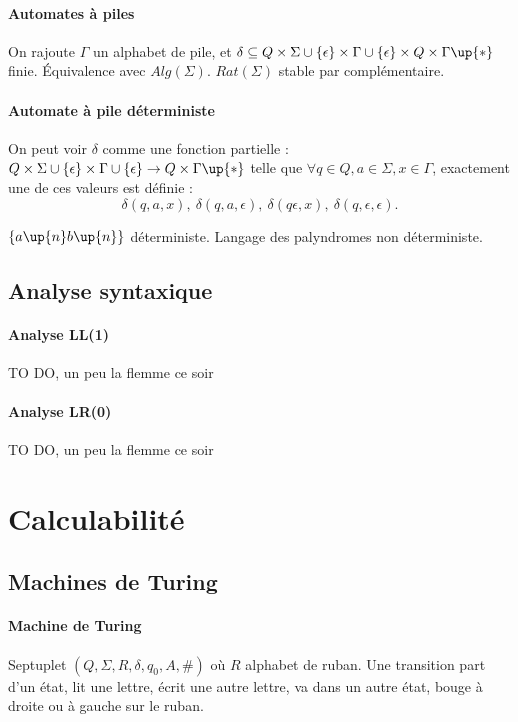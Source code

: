 \documentclass[french]{article}
\begin{document}
\paragraph{Automates à piles}
On rajoute $\Gamma$ un alphabet de pile, et $\delta\subseteq Q\times\Sigma\cup\{\epsilon\}\times\Gamma\cup\{\epsilon\}\times Q\times\Gamma\up{*}$ finie. Équivalence avec $Alg(\Sigma)$. $Rat(\Sigma)$ stable par complémentaire.

\paragraph{Automate à pile déterministe}
On peut voir $\delta$ comme une fonction partielle : $Q\times\Sigma\cup\{\epsilon\}\times\Gamma\cup\{\epsilon\}\rightarrow Q\times\Gamma\up{*}$ telle que $\forall q\in Q, a\in\Sigma, x\in\Gamma$, exactement une de ces valeurs est définie : $$\delta(q,a,x),\ \delta(q,a,\epsilon),\ \delta(q\epsilon,x),\ \delta(q,\epsilon,\epsilon).$$

$\{a\up{n}b\up{n}\}$ déterministe. Langage des palyndromes non déterministe.

\subsection{Analyse syntaxique}
\paragraph{Analyse LL(1)}
TO DO, un peu la flemme ce soir
\paragraph{Analyse LR(0)}
TO DO, un peu la flemme ce soir

\section{Calculabilité}
\subsection{Machines de Turing}
\paragraph{Machine de Turing}
Septuplet $(Q,\Sigma, R, \delta, q_0, A, \#)$ où $R$ alphabet de ruban. Une transition part d'un état, lit une lettre, écrit une autre lettre, va dans un autre état, bouge à droite ou à gauche sur le ruban.
\end{document}
